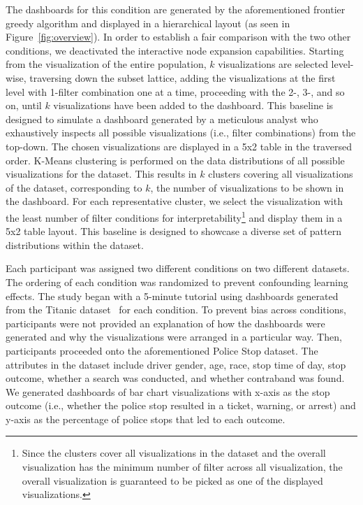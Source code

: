 \stitle{\system:} The dashboards for this condition are generated by the aforementioned frontier greedy algorithm and displayed in a hierarchical layout (as seen in Figure~\ref{fig:overview}).  In order to establish a fair comparison with the two other conditions, we deactivated  the interactive node expansion capabilities.
 Starting from the visualization of the entire population, $k$ visualizations are selected level-wise, traversing down the subset lattice, adding the visualizations at the first level with 1-filter combination one at a time, proceeding with the 2-, 3-, and so on, until $k$ visualizations have been added to the dashboard. This baseline is designed to simulate a dashboard generated by a meticulous analyst who exhaustively inspects all possible visualizations (i.e., filter combinations) from the top-down. The chosen visualizations are displayed in a 5x2 table in the traversed order.
\stitle{\cluster:} K-Means clustering is performed on the data distributions of all possible visualizations for the dataset. This results in $k$ clusters covering all visualizations of the dataset, corresponding to $k$, the number of visualizations to be shown in the dashboard. For each representative cluster, we select the visualization with the least number of filter conditions for interpretability\footnote{Since the clusters cover all visualizations in the dataset and the overall visualization has the minimum number of filter across all visualization, the overall visualization is guaranteed to be picked as one of the displayed visualizations.} and display them in a 5x2 table layout. This baseline is designed to showcase a diverse set of pattern distributions within the dataset.
\par Each participant was assigned two different conditions on two different datasets. The ordering of each condition was randomized to prevent confounding learning effects. The study began with a 5-minute tutorial using dashboards generated from the Titanic dataset~\cite{titanic} for each condition. To prevent bias across conditions, participants were not provided an explanation of how the dashboards were generated and why the visualizations were arranged in a particular way. Then, participants proceeded onto the aforementioned Police Stop dataset. The attributes in the dataset include driver gender, age, race, stop time of day, stop outcome, whether a search was conducted, and whether contraband was found. We generated dashboards of bar chart visualizations with x-axis as the stop outcome (i.e., whether the police stop resulted in a ticket, warning, or arrest) and y-axis as the percentage of police stops that led to each outcome. %
